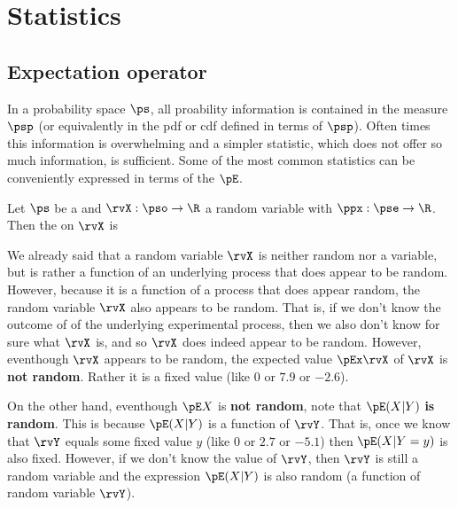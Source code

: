 \chapter{Statistics}
\label{chp:stats}
\section{Expectation operator}
In a probability space $\ps$, all proability information
is contained in the measure $\psp$ (or equivalently in the pdf or cdf
defined in terms of $\psp$).
Often times this information is overwhelming and a simpler statistic,
which does not offer so much information, is sufficient.
Some of the most common statistics can be conveniently expressed in terms
of the  $\pE$.
\begin{definition}
\label{def:Ex}
Let $\ps$ be a  and
$\rvX:\pso\to\R$ a random variable with
 $\ppx:\pse\to\R$.
Then the  on $\rvX$ is
\end{definition}

We already said that a random variable $\rvX$ is neither random nor a variable,
but is rather a function of an underlying process that does appear to be random.
However, because it is a function of a process that does appear random,
the random variable $\rvX$ also appears to be random.
That is, if we don't know the outcome of of the underlying experimental
process, then we also don't know for sure what $\rvX$ is, and so $\rvX$ does
indeed appear to be random.
However, eventhough $\rvX$ appears to be random,
the expected value $\pEx\rvX$  of $\rvX$ is {\bf not random}.
Rather it is a fixed value (like $0$ or $7.9$ or $-2.6$).

On the other hand, eventhough $\pE X$ is {\bf not random},
note that $\pE(X|Y)$ {\bf is random}.
This is because $\pE(X|Y)$ is a function of $\rvY$.
That is, once we know that $\rvY$ equals some fixed value $y$
(like $0$ or $2.7$ or $-5.1$) then $\pE(X|Y=y)$ is also fixed.
However, if we don't know the value of $\rvY$,
then $\rvY$ is still a random variable and the expression $\pE(X|Y)$
is also random (a function of random variable $\rvY$).

